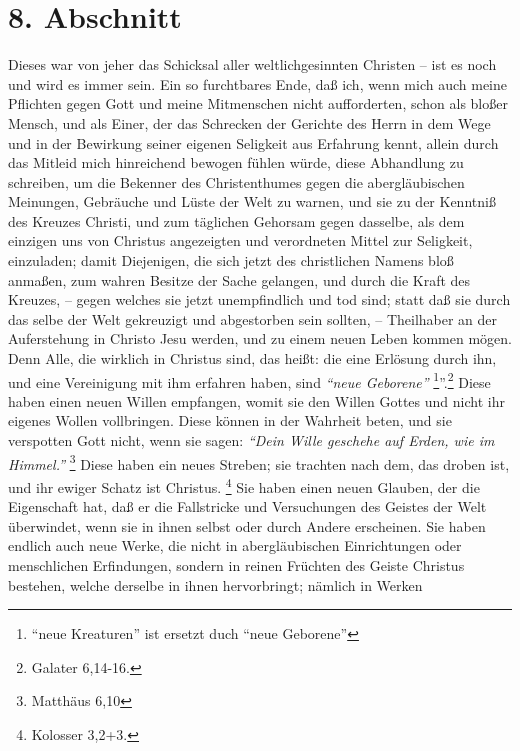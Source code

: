 \section{8. Abschnitt} \label{kap1_ab8}

Dieses war von jeher das Schicksal aller weltlichgesinnten Christen -- ist es
noch und wird es immer sein.
Ein so furchtbares Ende, daß ich, wenn mich auch meine Pflichten gegen Gott und
meine Mitmenschen nicht aufforderten, schon als bloßer Mensch, und als Einer,
der das Schrecken der Gerichte des Herrn in dem Wege und in der Bewirkung seiner
eigenen Seligkeit aus Erfahrung kennt, allein durch das Mitleid mich hinreichend
bewogen fühlen würde, diese Abhandlung zu schreiben, um die Bekenner des
Christenthumes gegen die abergläubischen Meinungen, Gebräuche und Lüste der Welt
zu warnen, und sie zu der Kenntniß des Kreuzes Christi, und zum täglichen
Gehorsam gegen dasselbe, als dem einzigen uns von Christus angezeigten und
verordneten Mittel zur Seligkeit, einzuladen;
damit Diejenigen, die sich jetzt des christlichen Namens bloß anmaßen, zum
wahren Besitze der Sache gelangen, und durch die Kraft des Kreuzes,
-- gegen welches sie jetzt unempfindlich und tod sind;
statt daß sie durch das selbe der Welt gekreuzigt und abgestorben sein sollten,
-- Theilhaber an der Auferstehung in Christo Jesu werden, und zu einem neuen
Leben kommen mögen.
Denn Alle, die wirklich in Christus sind, das heißt:
die eine Erlösung durch ihn, und eine Vereinigung mit ihm erfahren haben, sind
\textit{"`neue Geborene"'}
\footnote{"`neue Kreaturen"' ist ersetzt duch "`neue Geborene"'}''.\footnote{Galater 6,14-16.}
Diese haben einen neuen Willen empfangen, womit sie den Willen Gottes und nicht
ihr eigenes Wollen vollbringen.
Diese können in der Wahrheit beten, und sie verspotten Gott nicht, wenn sie
sagen:
\textit{"`Dein Wille geschehe auf Erden, wie im Himmel."'}
\footnote{Matthäus 6,10}
Diese haben ein neues Streben;
sie trachten nach dem, das droben ist, und ihr ewiger Schatz ist
Christus.
\footnote{Kolosser 3,2+3.}
Sie haben einen neuen Glauben, der die Eigenschaft hat, daß er die Fallstricke
und Versuchungen des Geistes der Welt überwindet, wenn sie in ihnen selbst oder
durch Andere erscheinen.
Sie haben endlich auch neue Werke, die nicht in abergläubischen Einrichtungen
oder menschlichen Erfindungen, sondern in reinen Früchten des Geiste Christus
 bestehen, welche derselbe in ihnen hervorbringt;
nämlich in Werken
